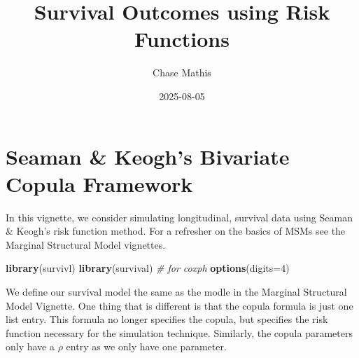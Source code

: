 \documentclass[
]{article}
\title{Survival Outcomes using Risk Functions}
\author{Chase Mathis}
\date{2025-08-05}
\newenvironment{Shaded}{\begin{snugshade}}{\end{snugshade}}
\newcommand{\AttributeTok}[1]{\textcolor[rgb]{0.13,0.29,0.53}{#1}}
\newcommand{\CommentTok}[1]{\textcolor[rgb]{0.56,0.35,0.01}{\textit{#1}}}
\newcommand{\DecValTok}[1]{\textcolor[rgb]{0.00,0.00,0.81}{#1}}
\newcommand{\FunctionTok}[1]{\textcolor[rgb]{0.13,0.29,0.53}{\textbf{#1}}}
\newcommand{\NormalTok}[1]{#1}
\begin{document}
\maketitle

\section{Seaman \& Keogh's Bivariate Copula
Framework}\label{seaman-keoghs-bivariate-copula-framework}

In this vignette, we consider simulating longitudinal, survival data
using Seaman \& Keogh's risk function method. For a refresher on the
basics of MSMs see the Marginal Structural Model vignettes.

\begin{Shaded}
\begin{Highlighting}[]
\FunctionTok{library}\NormalTok{(survivl)}
\FunctionTok{library}\NormalTok{(survival) }\CommentTok{\# for coxph}
\FunctionTok{options}\NormalTok{(}\AttributeTok{digits=}\DecValTok{4}\NormalTok{)}
\end{Highlighting}
\end{Shaded}

We define our survival model the same as the modle in the Marginal
Structural Model Vignette. One thing that is different is that the
copula formula is just one list entry. This formula no longer specifies
the copula, but specifies the risk function necessary for the simulation
technique. Similarly, the copula parameters only have a \(\rho\) entry
as we only have one parameter.
\end{document}
